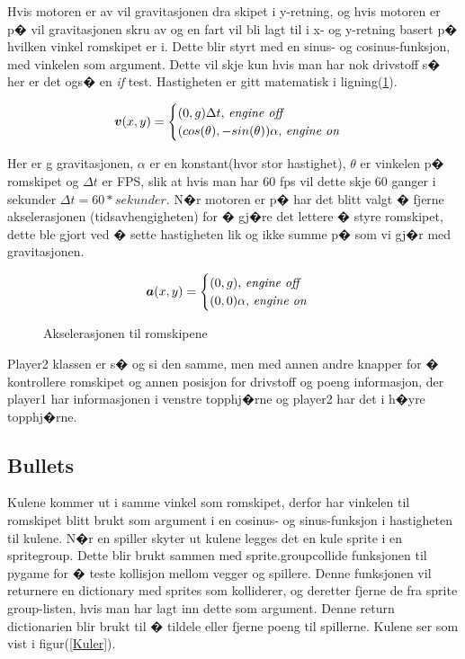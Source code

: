 {Hvis motoren er av vil gravitasjonen dra skipet i y-retning, og hvis motoren er p� vil gravitasjonen skru av og en fart vil bli lagt til i x- og y-retning basert p� hvilken vinkel romskipet er i. Dette blir styrt med en sinus- og cosinus-funksjon, med vinkelen som argument. Dette vil skje kun hvis man har nok drivstoff s� her er det ogs� en \emph{if} test. Hastigheten er gitt matematisk i ligning(\ref{hastighet}).

\begin{equation}
    \boldsymbol{v}(x,y) = 
  \begin{cases}
    (0, g)\Delta t ,\,\textit{engine off} \\
    (cos(\theta), -sin(\theta))\alpha,\,\textit{engine on}
  \end{cases}
  \label{hastighet}
\end{equation}

Her er g gravitasjonen, $\alpha$ er en konstant(hvor stor hastighet), $\theta $ er vinkelen p� romskipet og $\Delta t$ er FPS, slik at hvis man har 60 fps vil dette skje 60 ganger i sekunder $\Delta t = 60*sekunder$. N�r motoren er p� har det blitt valgt � fjerne akselerasjonen (tidsavhengigheten) for � gj�re det lettere � styre romskipet, dette ble gjort ved � sette hastigheten lik og ikke summe p� som vi gj�r med gravitasjonen.\\

\begin{figure}
\begin{equation}
    \boldsymbol{a}(x,y) = 
  \begin{cases}
    (0, g) ,\,\textit{engine off} \\
    (0, 0)\alpha,\,\textit{engine on}
  \end{cases}
\end{equation}
\label{hastighet}
\caption{Akselerasjonen til romskipene}
\end{figure}

Player2 klassen er s� og si den samme, men med annen andre knapper for � kontrollere romskipet og annen posisjon for drivstoff og poeng informasjon, der player1 har informasjonen i venstre topphj�rne og player2 har det i h�yre topphj�rne.





\subsection{Bullets}

Kulene kommer ut i samme vinkel som romskipet, derfor har vinkelen til romskipet blitt brukt som argument i en cosinus- og sinus-funksjon i hastigheten til kulene. N�r en spiller skyter ut kulene legges det en kule sprite i en spritegroup. Dette blir brukt sammen med sprite.groupcollide funksjonen til pygame for � teste kollisjon mellom vegger og spillere. Denne funksjonen vil returnere en dictionary med sprites som kolliderer, og deretter fjerne de fra sprite group-listen, hvis man har lagt inn dette som argument. Denne return dictionarien blir brukt til � tildele eller fjerne poeng til spillerne. Kulene ser som vist i figur(\ref{Kuler}).

}
